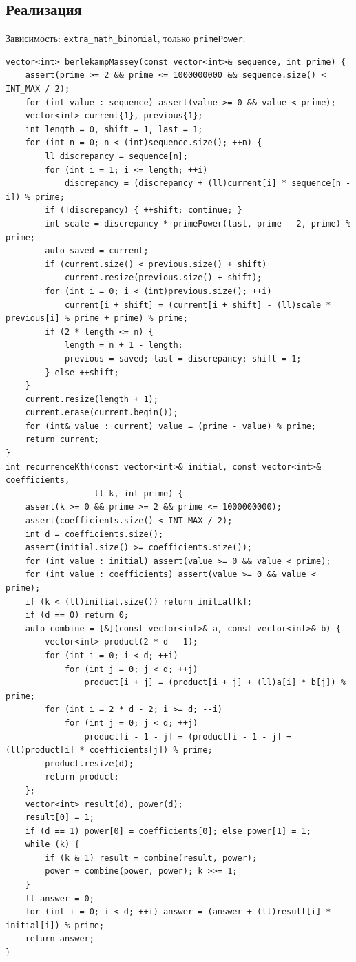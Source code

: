 \subsection*{Реализация}
Зависимость: \texttt{extra\_math\_binomial}, только \texttt{primePower}.
\begin{lstlisting}[name=extra_math_recurrence]
vector<int> berlekampMassey(const vector<int>& sequence, int prime) {
    assert(prime >= 2 && prime <= 1000000000 && sequence.size() < INT_MAX / 2);
    for (int value : sequence) assert(value >= 0 && value < prime);
    vector<int> current{1}, previous{1};
    int length = 0, shift = 1, last = 1;
    for (int n = 0; n < (int)sequence.size(); ++n) {
        ll discrepancy = sequence[n];
        for (int i = 1; i <= length; ++i)
            discrepancy = (discrepancy + (ll)current[i] * sequence[n - i]) % prime;
        if (!discrepancy) { ++shift; continue; }
        int scale = discrepancy * primePower(last, prime - 2, prime) % prime;
        auto saved = current;
        if (current.size() < previous.size() + shift)
            current.resize(previous.size() + shift);
        for (int i = 0; i < (int)previous.size(); ++i)
            current[i + shift] = (current[i + shift] - (ll)scale * previous[i] % prime + prime) % prime;
        if (2 * length <= n) {
            length = n + 1 - length;
            previous = saved; last = discrepancy; shift = 1;
        } else ++shift;
    }
    current.resize(length + 1);
    current.erase(current.begin());
    for (int& value : current) value = (prime - value) % prime;
    return current;
}
int recurrenceKth(const vector<int>& initial, const vector<int>& coefficients,
                  ll k, int prime) {
    assert(k >= 0 && prime >= 2 && prime <= 1000000000);
    assert(coefficients.size() < INT_MAX / 2);
    int d = coefficients.size();
    assert(initial.size() >= coefficients.size());
    for (int value : initial) assert(value >= 0 && value < prime);
    for (int value : coefficients) assert(value >= 0 && value < prime);
    if (k < (ll)initial.size()) return initial[k];
    if (d == 0) return 0;
    auto combine = [&](const vector<int>& a, const vector<int>& b) {
        vector<int> product(2 * d - 1);
        for (int i = 0; i < d; ++i)
            for (int j = 0; j < d; ++j)
                product[i + j] = (product[i + j] + (ll)a[i] * b[j]) % prime;
        for (int i = 2 * d - 2; i >= d; --i)
            for (int j = 0; j < d; ++j)
                product[i - 1 - j] = (product[i - 1 - j] + (ll)product[i] * coefficients[j]) % prime;
        product.resize(d);
        return product;
    };
    vector<int> result(d), power(d);
    result[0] = 1;
    if (d == 1) power[0] = coefficients[0]; else power[1] = 1;
    while (k) {
        if (k & 1) result = combine(result, power);
        power = combine(power, power); k >>= 1;
    }
    ll answer = 0;
    for (int i = 0; i < d; ++i) answer = (answer + (ll)result[i] * initial[i]) % prime;
    return answer;
}
\end{lstlisting}
